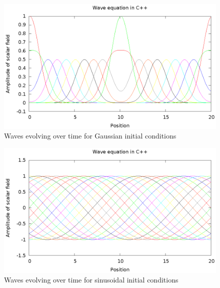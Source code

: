 \begin{figure}
  \includegraphics{gaussWave}
  \caption{Waves evolving over time for Gaussian initial conditions}
  \label{gaussWave}
\end{figure}

\begin{figure}
  \includegraphics{sineWave}
  \caption{Waves evolving over time for sinusoidal initial conditions}
  \label{sineWave}
\end{figure}

